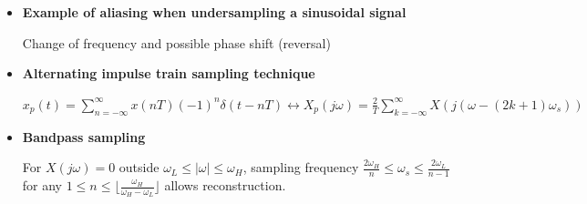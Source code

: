 \documentclass[10pt, twocolumn]{article}
\begin{document}
\begin{itemize}
    Thus, $X_d(e^{j\Omega}) = X_p(j\Omega/T)$ or $X_d(e^{j\omega T}) = X_p(j\omega)$.
    
    The plot of $X_d(e^{j\Omega})$ is obtained from the plot of $X_p(j\omega)$ by multiplying the $\omega$-axis labels of $X_p(j\omega)$ by T. So, $\omega_s = 2\pi/T$ becomes $\Omega = 2\pi$.

    \item \textbf{Example of aliasing when undersampling a sinusoidal signal}
    
    Change of frequency and possible phase shift (reversal)

    \item \textbf{Alternating impulse train sampling technique}
    
    $x_p(t) = \sum_{n=-\infty}^\infty x(nT)(-1)^n\delta(t-nT) \leftrightarrow X_p(j\omega) = \frac{2}{T}\sum_{k=-\infty}^\infty X(j(\omega-(2k+1)\omega_s))$

    \item \textbf{Bandpass sampling}
    
    For $X(j\omega) = 0$ outside $\omega_L \le |\omega| \le \omega_H$, sampling frequency $\frac{2\omega_H}{n} \le \omega_s \le \frac{2\omega_L}{n-1}$ for any $1 \le n \le \lfloor \frac{\omega_H}{\omega_H-\omega_L} \rfloor$ allows reconstruction.
\end{itemize}

\end{document}
